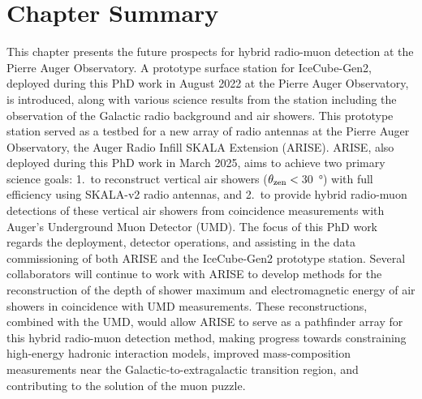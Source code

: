 \section{Chapter Summary}\label{sec:ch7_summary}
This chapter presents the future prospects for hybrid radio-muon detection at the Pierre Auger Observatory.
A prototype surface station for IceCube-Gen2, deployed during this PhD work in August 2022 at the Pierre Auger Observatory, is introduced, along with various science results from the station including the observation of the Galactic radio background and air showers.
This prototype station served as a testbed for a new array of radio antennas at the Pierre Auger Observatory, the Auger Radio Infill SKALA Extension (ARISE).
ARISE, also deployed during this PhD work in March 2025, aims to achieve two primary science goals: 1.~to reconstruct vertical air showers ($\theta_{\rm zen}<$\,\qty{30}{\degree}) with full efficiency using SKALA-v2 radio antennas, and 2.~to provide hybrid radio-muon detections of these vertical air showers from coincidence measurements with Auger's Underground Muon Detector (UMD).
The focus of this PhD work regards the deployment, detector operations, and assisting in the data commissioning of both ARISE and the IceCube-Gen2 prototype station.
Several collaborators will continue to work with ARISE to develop methods for the reconstruction of the depth of shower maximum and electromagnetic energy of air showers in coincidence with UMD measurements.
These reconstructions, combined with the UMD, would allow ARISE to serve as a pathfinder array for this hybrid radio-muon detection method, making progress towards constraining high-energy hadronic interaction models, improved mass-composition measurements near the Galactic-to-extragalactic transition region, and contributing to the solution of the muon puzzle.









